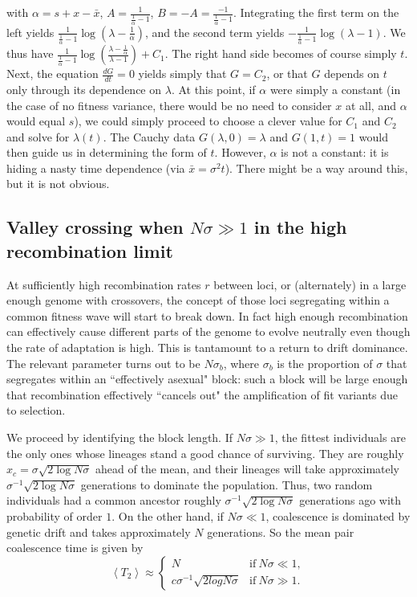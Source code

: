 \documentclass[10pt]{revtex4}
\begin{document}
with $\alpha = s+x-\bar{x}$, $A = \frac{1}{\frac{1}{\alpha} - 1}$, $B = -A = \frac{-1}{\frac{1}{\alpha} - 1}$.
Integrating the first term on the left yields $\frac{1}{\frac{1}{\alpha}-1}\log(\lambda - \frac{1}{\alpha})$, and the second term yields $-\frac{1}{\frac{1}{\alpha}-1}\log(\lambda - 1)$.
We thus have $\frac{1}{\frac{1}{\alpha}-1}\log(\frac{\lambda-\frac{1}{\alpha}}{\lambda-1}) + C_1$.
The right hand side becomes of course simply $t$.
Next, the equation $\frac{dG}{dt} = 0$ yields simply that $G = C_2$, or that $G$ depends on $t$ only through its dependence on $\lambda$.
At this point, if $\alpha$ were simply a constant (in the case of no fitness variance, there would be no need to consider $x$ at all, and $\alpha$ would equal $s$), we could simply proceed to choose a clever value for $C_1$ and $C_2$ and solve for $\lambda(t)$.
The Cauchy data $G(\lambda,0) = \lambda$ and $G(1,t) = 1$ would then guide us in determining the form of $t$.
However, $\alpha$ is not a constant: it is hiding a nasty time dependence (via $\bar{x} = \sigma^2 t$).
There might be a way around this, but it is not obvious.

\subsection{Valley crossing when $N\sigma \gg 1$ in the high recombination limit}

At sufficiently high recombination rates $r$ between loci, or (alternately) in a large enough genome with crossovers, the concept of those loci segregating within a common fitness wave will start to break down.
In fact high enough recombination can effectively cause different parts of the genome to evolve neutrally even though the rate of adaptation is high.
This is tantamount to a return to drift dominance.
The relevant parameter turns out to be $N\sigma_b$, where $\sigma_b$ is the proportion of $\sigma$ that segregates within an ``effectively asexual" block: such a block will be large enough that recombination effectively ``cancels out" the amplification of fit variants due to selection.

We proceed by identifying the block length.
If $N\sigma \gg 1$, the fittest individuals are the only ones whose lineages stand a good chance of surviving.
They are roughly $x_c = \sigma \sqrt{2 \log N\sigma}$ ahead of the mean, and their lineages will take approximately $\sigma^{-1} \sqrt{2 \log N\sigma}$ generations to dominate the population.
Thus, two random individuals had a common ancestor roughly $\sigma^{-1} \sqrt{2 \log N\sigma}$ generations ago with probability of order $1$.
On the other hand, if $N\sigma \ll 1$, coalescence is dominated by genetic drift and takes approximately $N$ generations. So the mean pair coalescence time is given by
\begin{equation}
\left< T_2 \right> \approx
\begin{cases}
N & \mathrm{if~} N\sigma \ll 1, \\
c\sigma^{-1}\sqrt{2 log N\sigma} & \mathrm{if~} N\sigma \gg 1.
\end{cases}
\end{equation}
\end{document}
